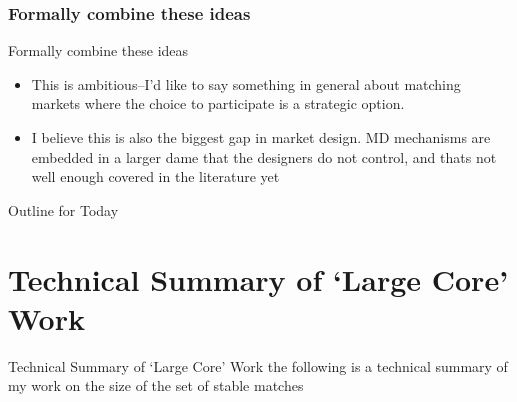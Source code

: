 \documentclass{beamer}
\begin{document}
\subsubsection{Formally combine these ideas}
\begin{frame}{Formally combine these ideas}
	\begin{itemize}
		\item This is ambitious--I'd like to say something in general about matching markets where the choice to participate is a strategic option.  
		\item I believe this is also the biggest gap in market design. MD mechanisms are embedded in a larger dame that the designers do not control, and thats not well enough covered in the literature yet
	\end{itemize}
	 
\end{frame}

\begin{frame}{Outline for Today}
	\tableofcontents
\end{frame}

\section{Technical Summary of `Large Core' Work}
\begin{frame}{Technical Summary of `Large Core' Work}
	the following is a technical summary of my work on the size of the set of stable matches
\end{frame}
\end{document}
